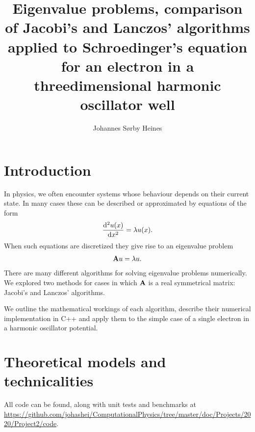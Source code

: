 \documentclass[a4paper,10pt,twocolumn]{article}
\title{Eigenvalue problems, comparison of Jacobi's and Lanczos' algorithms applied to Schroedinger’s equation for an electron in a threedimensional
harmonic oscillator well}
\author{Johannes Sørby Heines}
\begin{document}

\section*{Introduction}

In physics, we often encounter systems whose behaviour depends on their current state. In many cases these can be described or approximated by equations of the form  
\[
\dv[2]{u(x)}{x} = \lambda u(x).
\]
When such equations are discretized they give rise to an eigenvalue problem
\[
\vb{A}u = \lambda u.
\]
There are many different algorithms for solving eigenvalue problems numerically. We explored two methods for cases in which $\vb{A}$ is a real symmetrical matrix: Jacobi's and Lanczos' algorithms.  

We outline the mathematical workings of each algorithm, describe their numerical implementation in C++ and apply them to the simple case of a single electron in a harmonic oscillator potential. 

%
%
%
\section*{Theoretical models and technicalities}

All code can be found, along with unit tests and benchmarks at \url{https://github.com/johashei/ComputationalPhysics/tree/master/doc/Projects/2020/Project2/code}.
\end{document}
